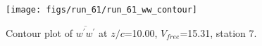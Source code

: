 \begin{figure}[H]
\centering
\texttt{[image: figs/run\_61/run\_61\_ww\_contour]}
\caption{Contour plot of $\overline{w^\prime w^\prime}$ at $z/c$=10.00, $V_{free}$=15.31, station 7.}
\end{figure}


